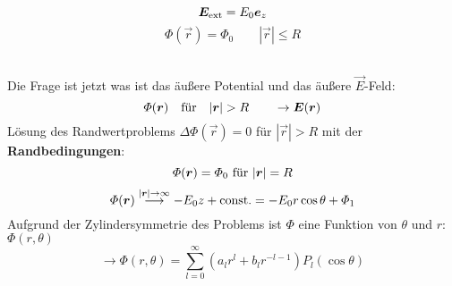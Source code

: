 \begin{minipage}{.5\linewidth}
	\centering
	\vspace{5pt}
\end{minipage}%
\begin{minipage}{.5\linewidth}
	\begin{equation*}
	\bm{E}_{\textrm{ext}} = E_0 \bm{e}_z
	\end{equation*}
	\begin{equation*}
	\Phi(\vec{r}) = \Phi_0 \qquad |\vec{r}| \le R
	\end{equation*}
\end{minipage}%
\\[5pt]
Die Frage ist jetzt was ist das äußere Potential und das äußere $ \vec{E} $-Feld:
\begin{equation*}
\varPhi(\bm{r}) \quad \textrm{für} \quad |\bm{r}| > R \qquad \rightarrow \bm{E}(\bm{r})
\end{equation*}
Lösung des Randwertproblems $ \Delta \Phi(\vec{r}) = 0 $ für $ |\vec{r}| > R $ mit der \textbf{Randbedingungen}:
$$ \varPhi(\bm{r}) = \varPhi_0 \textrm{ für }  |\bm{r}| = R $$
$$ \Phi(\vec{r}) \buildrel |\vec{r}| \to \infty \over \longrightarrow - E_0 z + \const = - E_0 r \cos\theta + \Phi_1 $$
Aufgrund der Zylindersymmetrie des Problems ist $ \Phi $ eine Funktion von $ \theta $ und $ r $: $ \Phi(r,\theta) $
\begin{equation*}
\rightarrow \Phi(r,\theta) = \sum_{l=0}^{\infty} \left(a_l r^l + b_l r^{-l-1}\right) P_l(\cos\theta)
\end{equation*}
